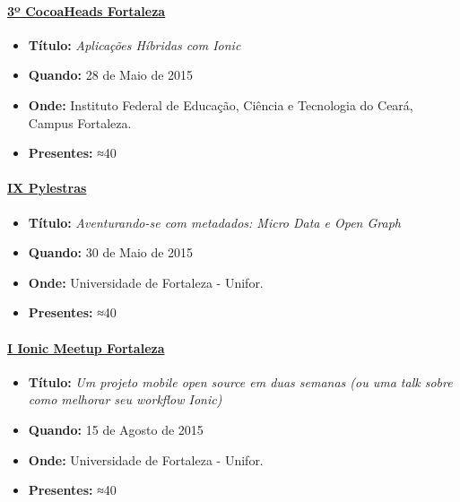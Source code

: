 \documentclass[]{article}
\providecommand{\tightlist}{%
  \setlength{\itemsep}{0pt}\setlength{\parskip}{0pt}}
\let\oldparagraph\paragraph
\renewcommand{\paragraph}[1]{\oldparagraph{#1}\mbox{}}
\begin{document}
\paragraph{\texorpdfstring{\href{http://www.cocoaheads.com.br/agendas/detalhes/79/}{3º
CocoaHeads
Fortaleza}}{3º CocoaHeads Fortaleza}}\label{uxba-cocoaheads-fortaleza}

\begin{itemize}
\tightlist
\item
  \textbf{Título:} \emph{Aplicações Híbridas com Ionic}
\item
  \textbf{Quando:} 28 de Maio de 2015
\item
  \textbf{Onde:} Instituto Federal de Educação, Ciência e Tecnologia do
  Ceará, Campus Fortaleza.
\item
  \textbf{Presentes:} ≈40
\end{itemize}

\paragraph{\texorpdfstring{\href{http://pylestras.org/evento/ix-pylestras/}{IX
Pylestras}}{IX Pylestras}}\label{ix-pylestras}

\begin{itemize}
\tightlist
\item
  \textbf{Título:} \emph{Aventurando-se com metadados: Micro Data e Open
  Graph}
\item
  \textbf{Quando:} 30 de Maio de 2015
\item
  \textbf{Onde:} Universidade de Fortaleza - Unifor.
\item
  \textbf{Presentes:} ≈40
\end{itemize}

\paragraph{\texorpdfstring{\href{http://www.meetup.com/pt/Ionic-Ceara/events/224620543/}{I
Ionic Meetup
Fortaleza}}{I Ionic Meetup Fortaleza}}\label{i-ionic-meetup-fortaleza}

\begin{itemize}
\tightlist
\item
  \textbf{Título:} \emph{Um projeto mobile open source em duas semanas
  (ou uma talk sobre como melhorar seu workflow Ionic)}
\item
  \textbf{Quando:} 15 de Agosto de 2015
\item
  \textbf{Onde:} Universidade de Fortaleza - Unifor.
\item
  \textbf{Presentes:} ≈40
\end{itemize}
\end{document}
